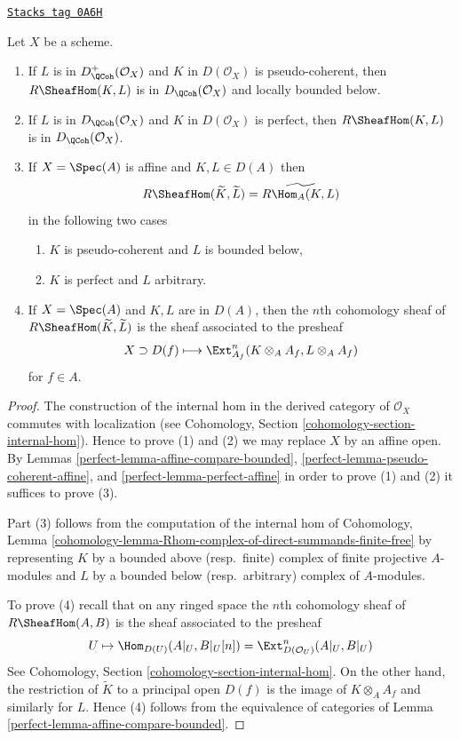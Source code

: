 \begin{lemma}
\label{perfect-lemma-quasi-coherence-internal-hom}
\href{https://stacks.math.columbia.edu/tag/0A6H}{\texttt{Stacks tag 0A6H}}

Let $X$ be a scheme.
\begin{enumerate}
\item If $L$ is in $D^+_\QCoh(\mathcal{O}_X)$ and
$K$ in $D(\mathcal{O}_X)$ is pseudo-coherent, then
$R\SheafHom(K, L)$ is in $D_\QCoh(\mathcal{O}_X)$
and locally bounded below.
\item If $L$ is in $D_\QCoh(\mathcal{O}_X)$ and
$K$ in $D(\mathcal{O}_X)$ is perfect, then
$R\SheafHom(K, L)$ is in $D_\QCoh(\mathcal{O}_X)$.
\item If $X = \Spec(A)$ is affine and $K, L \in D(A)$ then
$$
R\SheafHom(\widetilde{K}, \widetilde{L}) = \widetilde{R\Hom_A(K, L)}
$$
in the following two cases
\begin{enumerate}
\item $K$ is pseudo-coherent and $L$ is bounded below,
\item $K$ is perfect and $L$ arbitrary.
\end{enumerate}
\item If $X = \Spec(A)$ and $K, L$ are in $D(A)$, then the $n$th
cohomology sheaf of $R\SheafHom(\widetilde{K}, \widetilde{L})$
is the sheaf associated to the presheaf
$$
X \supset D(f) \longmapsto \Ext^n_{A_f}(K \otimes_A A_f, L \otimes_A A_f)
$$
for $f \in A$.
\end{enumerate}
\end{lemma}

\begin{proof}

The construction of the internal hom in the derived category of
$\mathcal{O}_X$ commutes with localization (see
Cohomology, Section \ref{cohomology-section-internal-hom}).
Hence to prove (1) and (2) we may replace $X$ by an affine open.
By Lemmas \ref{perfect-lemma-affine-compare-bounded},
\ref{perfect-lemma-pseudo-coherent-affine}, and
\ref{perfect-lemma-perfect-affine}
in order to prove (1) and (2) it suffices to prove (3).

\medskip\noindent
Part (3) follows from the computation of the
internal hom of Cohomology, Lemma
\ref{cohomology-lemma-Rhom-complex-of-direct-summands-finite-free}
by representing $K$ by a bounded above (resp.\ finite) complex of
finite projective $A$-modules and $L$ by a bounded below
(resp.\ arbitrary) complex of $A$-modules.

\medskip\noindent
To prove (4) recall that on any ringed space the $n$th cohomology sheaf of
$R\SheafHom(A, B)$ is the sheaf associated to the presheaf
$$
U \mapsto \Hom_{D(U)}(A|_U, B|_U[n]) =
\Ext^n_{D(\mathcal{O}_U)}(A|_U, B|_U)
$$
See Cohomology, Section \ref{cohomology-section-internal-hom}.
On the other hand, the restriction of $\widetilde{K}$ to a principal
open $D(f)$ is the image of $K \otimes_A A_f$ and similarly for $L$.
Hence (4) follows from the equivalence of categories of
Lemma \ref{perfect-lemma-affine-compare-bounded}.
\end{proof}

